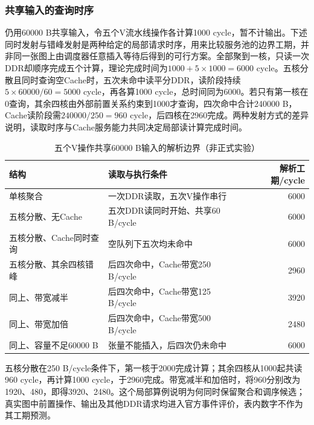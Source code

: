 \subsubsection{共享输入的查询时序}
仍用60000 B共享输入，令五个V流水线操作各计算1000 cycle，暂不计输出。下述同时发射与错峰发射是两种给定的局部请求时序，用来比较服务池的边界工期，并非同一张图上由调度器任意插入等待后得到的可行方案。全部聚到一核，只读一次DDR却顺序完成五个计算，理论完成时间为$1000+5\times1000=6000$ cycle。五核分散且同时查询空Cache时，五次未命中读平分DDR，读阶段持续$5\times60000/60=5000$ cycle，再各算1000 cycle，总时间同为6000。若只有第一核在0查询，其余四核由外部前置关系约束到1000才查询，四次命中合计240000 B，Cache读阶段需$240000/250=960$ cycle，后四核在2960完成。两种发射方式的差异说明，读取时序与Cache服务能力共同决定局部读计算完成时间。
\begin{table}[H]\centering\caption{五个V操作共享60000 B输入的解析边界（非正式实验）}\label{tab:c-five-example}
\begin{tabularx}{\linewidth}{lYr}\toprule
结构 & 读取与执行条件 & 解析工期/cycle\\\midrule
单核聚合 & 一次DDR读取，五次V操作串行 & 6000\\
五核分散、无Cache & 五次DDR读同时开始、共享60 B/cycle & 6000\\
五核分散、Cache同时查询 & 空队列下五次均未命中 & 6000\\
五核分散、其余四核错峰 & 后四次命中，Cache带宽250 B/cycle & 2960\\
同上、带宽减半 & 后四次命中，Cache带宽125 B/cycle & 3920\\
同上、带宽加倍 & 后四次命中，Cache带宽500 B/cycle & 2480\\
同上、容量不足60000 B & 张量不能插入，后四次仍未命中 & 6000\\\bottomrule
\end{tabularx}\end{table}
五核分散在250 B/cycle条件下，第一核于2000完成计算；其余四核从1000起共读960 cycle，再计算1000 cycle，于2960完成。带宽减半和加倍时，将960分别改为1920、480，即得3920、2480。这个局部算例说明为何同时保留聚合和调序候选；真实图中前置操作、输出及其他DDR请求均进入官方事件评价，表内数字不作为其工期预测。


